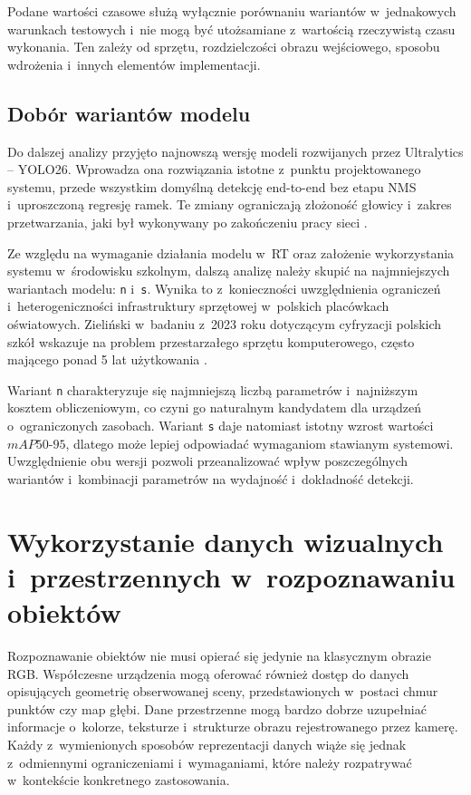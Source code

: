 Podane wartości czasowe służą wyłącznie porównaniu wariantów w~jednakowych warunkach testowych i~nie mogą być utożsamiane z~wartością rzeczywistą czasu wykonania. Ten zależy od sprzętu, rozdzielczości obrazu wejściowego, sposobu wdrożenia i~innych elementów implementacji.

\subsection{Dobór wariantów modelu}

Do dalszej analizy przyjęto najnowszą wersję modeli rozwijanych przez Ultralytics -- YOLO26. Wprowadza ona rozwiązania istotne z~punktu projektowanego systemu, przede wszystkim domyślną detekcję end-to-end bez etapu NMS i~uproszczoną regresję ramek. Te zmiany ograniczają złożoność głowicy i~zakres przetwarzania, jaki był wykonywany po zakończeniu pracy sieci \cite{bib:jocher2026ultralyticsyolo26}.

Ze względu na wymaganie działania modelu w~RT oraz założenie wykorzystania systemu w~środowisku szkolnym, dalszą analizę należy skupić na najmniejszych wariantach modelu: \texttt{n} i~\texttt{s}. Wynika to z~konieczności uwzględnienia ograniczeń i~heterogeniczności infrastruktury sprzętowej w~polskich placówkach oświatowych. Zieliński w~badaniu z~2023 roku dotyczącym cyfryzacji polskich szkół wskazuje na problem przestarzałego sprzętu komputerowego, często mającego ponad 5 lat użytkowania \cite{bib:zielinski2023cyfryzacja}.

Wariant \texttt{n} charakteryzuje się najmniejszą liczbą parametrów i~najniższym kosztem obliczeniowym, co czyni go naturalnym kandydatem dla urządzeń o~ograniczonych zasobach. Wariant \texttt{s} daje natomiast istotny wzrost wartości $mAP50\text{-}95$, dlatego może lepiej odpowiadać wymaganiom stawianym systemowi. Uwzględnienie obu wersji pozwoli przeanalizować wpływ poszczególnych wariantów i~kombinacji parametrów na wydajność i~dokładność detekcji.

\section{Wykorzystanie danych wizualnych i~przestrzennych w~rozpoznawaniu obiektów}

Rozpoznawanie obiektów nie musi opierać się jedynie na klasycznym obrazie RGB. Współczesne urządzenia mogą oferować również dostęp do danych opisujących geometrię obserwowanej sceny, przedstawionych w~postaci chmur punktów czy map głębi. Dane przestrzenne mogą bardzo dobrze uzupełniać informacje o~kolorze, teksturze i~strukturze obrazu rejestrowanego przez kamerę. Każdy z~wymienionych sposobów reprezentacji danych wiąże się jednak z~odmiennymi ograniczeniami i~wymaganiami, które należy rozpatrywać w~kontekście konkretnego zastosowania.

